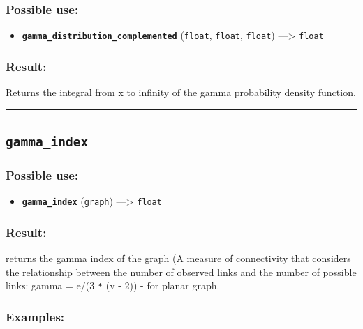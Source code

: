 \documentclass[]{book}
\providecommand{\tightlist}{%
  \setlength{\itemsep}{0pt}\setlength{\parskip}{0pt}}
\theoremstyle{definition}
\theoremstyle{definition}
\theoremstyle{definition}
\theoremstyle{remark}
\begin{document}
\subsubsection{Possible use:}\label{possible-use-182}

\begin{itemize}
\tightlist
\item
  \textbf{\texttt{gamma\_distribution\_complemented}} (\texttt{float},
  \texttt{float}, \texttt{float}) ---\textgreater{} \texttt{float}
\end{itemize}

\subsubsection{Result:}\label{result-176}

Returns the integral from x to infinity of the gamma probability density
function.

\begin{center}\rule{0.5\linewidth}{\linethickness}\end{center}

\subsection{\texorpdfstring{\texttt{gamma\_index}}{gamma\_index}}\label{gamma_index}

\subsubsection{Possible use:}\label{possible-use-183}

\begin{itemize}
\tightlist
\item
  \textbf{\texttt{gamma\_index}} (\texttt{graph}) ---\textgreater{}
  \texttt{float}
\end{itemize}

\subsubsection{Result:}\label{result-177}

returns the gamma index of the graph (A measure of connectivity that
considers the relationship between the number of observed links and the
number of possible links: gamma = e/(3 \texttt{*} (v - 2)) - for planar
graph.

\subsubsection{Examples:}\label{examples-133}
\end{document}
